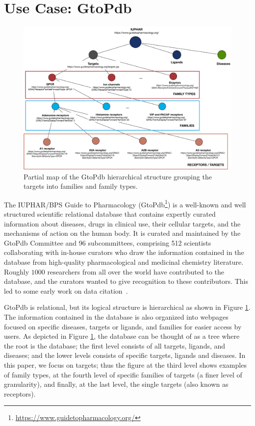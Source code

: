 \section{Use Case: GtoPdb}
\label{section:use_case}

\begin{figure}[t]
\centering
  \includegraphics[width=.9\textwidth]{figures/iuphar_schema}
  \caption{Partial map of the GtoPdb hierarchical structure grouping the targets into families and family types.}
  \label{figure:iuphar_schema}
\end{figure}

The IUPHAR/BPS Guide to Pharmacology \citep{iuphar2018}  (GtoPdb\footnote{\url{https://www.guidetopharmacology.org/}}) is a well-known and well structured scientific relational database that contains expertly curated information about diseases, drugs in clinical use, their cellular targets, and the mechanisms of action on the human body. 
It is curated and maintained by the GtoPdb Committee and 96 subcommittees, comprising 512 scientists collaborating with in-house curators who draw the information contained in the database from high-quality pharmacological and medicinal chemistry literature.
Roughly $1000$ researchers from all over the world have contributed to the database, and the curators wanted to give recognition to these contributors.  This led to some early work on data citation~\citep{buneman2006cite}.  

GtoPdb is relational, but its logical structure is hierarchical as shown in Figure \ref{figure:iuphar_schema}.  The information contained in the database is also organized into webpages focused on specific diseases, targets or ligands, and families %
for easier access by users. 
As depicted in Figure \ref{figure:iuphar_schema}, the database can be thought of as a tree where the root is the database; the first level consists of all targets, ligands, and diseases; and the lower levels consists of specific targets, ligands and diseases. 
In this paper, we focus on targets; thus the figure at the third level shows examples of family types, at the fourth level of specific families of targets (a finer level of granularity), and finally, at the last level, the single targets (also known as receptors). 

